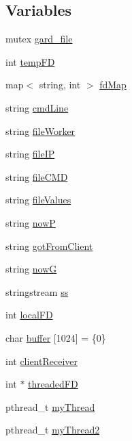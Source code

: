 \subsection*{Variables}
\begin{DoxyCompactItemize}
\item 
mutex \hyperlink{serverAndParcer_8c_09_09_af720f0c5d7682d27ea06535a0408f010}{gard\+\_\+file}
\item 
int \hyperlink{serverAndParcer_8c_09_09_a89332d7c70244b790f94bf228c1e0a77}{temp\+FD}
\item 
map$<$ string, int $>$ \hyperlink{serverAndParcer_8c_09_09_a7b52f11370f23127166efe77741fb300}{fd\+Map}
\item 
string \hyperlink{serverAndParcer_8c_09_09_abb7f3464285c3d84163f357cc63ff31d}{cmd\+Line}
\item 
string \hyperlink{serverAndParcer_8c_09_09_a9ba663e6154cc157828089066f027dcc}{file\+Worker}
\item 
string \hyperlink{serverAndParcer_8c_09_09_a11d2731ef567b8160d86c55b499b0ac4}{file\+IP}
\item 
string \hyperlink{serverAndParcer_8c_09_09_abaa81f4ff239a69a48842b243b10ad90}{file\+C\+MD}
\item 
string \hyperlink{serverAndParcer_8c_09_09_a7c28ba1e10886eb734b91a0aa78f7f76}{file\+Values}
\item 
string \hyperlink{serverAndParcer_8c_09_09_aa1793b72906465979b4f03f4f077b330}{nowP}
\item 
string \hyperlink{serverAndParcer_8c_09_09_a8d7df023ae54da17f967ad9cdd6fde61}{got\+From\+Client}
\item 
string \hyperlink{serverAndParcer_8c_09_09_a3f71f79c62b8a333782d8cfde710bc1e}{nowG}
\item 
stringstream \hyperlink{serverAndParcer_8c_09_09_a677b8ed49d2bb57ed6a846354f664158}{ss}
\item 
int \hyperlink{serverAndParcer_8c_09_09_a862b5ef7a7e9bdc9916f0b9db33ba22e}{local\+FD}
\item 
char \hyperlink{serverAndParcer_8c_09_09_a28d4d3d8445e73a696b2d6f7eadabd96}{buffer} \mbox{[}1024\mbox{]} = \{0\}
\item 
int \hyperlink{serverAndParcer_8c_09_09_a2a39628b8f82d949fb4514c8f545a1f1}{client\+Receiver}
\item 
int $\ast$ \hyperlink{serverAndParcer_8c_09_09_ac680e479dd556dd533714550745728fc}{threaded\+FD}
\item 
pthread\+\_\+t \hyperlink{serverAndParcer_8c_09_09_a72270023936003efefbcc525c734a029}{my\+Thread}
\item 
pthread\+\_\+t \hyperlink{serverAndParcer_8c_09_09_a8bbd1b7cb6be922a885d26ec5ce117ac}{my\+Thread2}
\end{DoxyCompactItemize}


